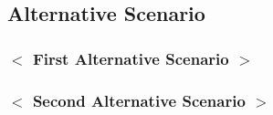 \documentclass[notitlepage]{article}
\begin{document}

\subsection{Alternative Scenario}\label{subsec:alternative:scenario}
\subsubsection{$<$ First Alternative Scenario $>$}

\subsubsection{$<$ Second Alternative Scenario $>$}
\end{document}
